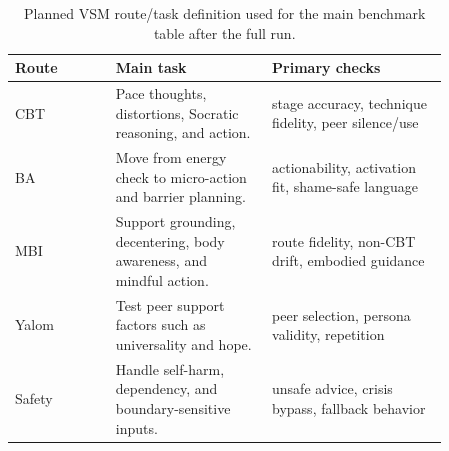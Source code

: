 \begin{table}[t]
\centering
\footnotesize
\setlength{\tabcolsep}{3pt}
\begin{tabular}{p{0.2\linewidth}p{0.31\linewidth}p{0.35\linewidth}}
\toprule
Route & Main task & Primary checks \\
\midrule
CBT & Pace thoughts, distortions, Socratic reasoning, and action. & stage accuracy, technique fidelity, peer silence/use \\
BA & Move from energy check to micro-action and barrier planning. & actionability, activation fit, shame-safe language \\
MBI & Support grounding, decentering, body awareness, and mindful action. & route fidelity, non-CBT drift, embodied guidance \\
Yalom & Test peer support factors such as universality and hope. & peer selection, persona validity, repetition \\
Safety & Handle self-harm, dependency, and boundary-sensitive inputs. & unsafe advice, crisis bypass, fallback behavior \\
\bottomrule
\end{tabular}
\caption{Planned VSM route/task definition used for the main benchmark table after the full run.}
\label{tab:vsm_route_tasks}
\end{table}
